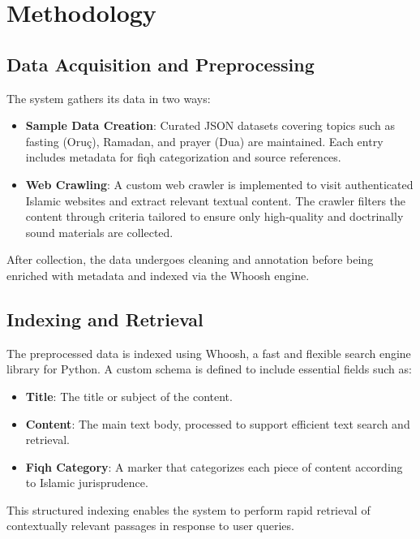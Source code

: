 \documentclass[12pt,a4paper]{article}
\begin{document}
\section{Methodology}
\subsection{Data Acquisition and Preprocessing}
The system gathers its data in two ways:
\begin{itemize}
    \item \textbf{Sample Data Creation}: Curated JSON datasets covering topics such as fasting (Oruç), Ramadan, and prayer (Dua) are maintained. Each entry includes metadata for fiqh categorization and source references.
    \item \textbf{Web Crawling}: A custom web crawler is implemented to visit authenticated Islamic websites and extract relevant textual content. The crawler filters the content through criteria tailored to ensure only high-quality and doctrinally sound materials are collected.
\end{itemize}
After collection, the data undergoes cleaning and annotation before being enriched with metadata and indexed via the Whoosh engine.

\subsection{Indexing and Retrieval}
The preprocessed data is indexed using Whoosh, a fast and flexible search engine library for Python. A custom schema is defined to include essential fields such as:
\begin{itemize}
    \item \textbf{Title}: The title or subject of the content.
    \item \textbf{Content}: The main text body, processed to support efficient text search and retrieval.
    \item \textbf{Fiqh Category}: A marker that categorizes each piece of content according to Islamic jurisprudence.
\end{itemize}
This structured indexing enables the system to perform rapid retrieval of contextually relevant passages in response to user queries.
\end{document}
